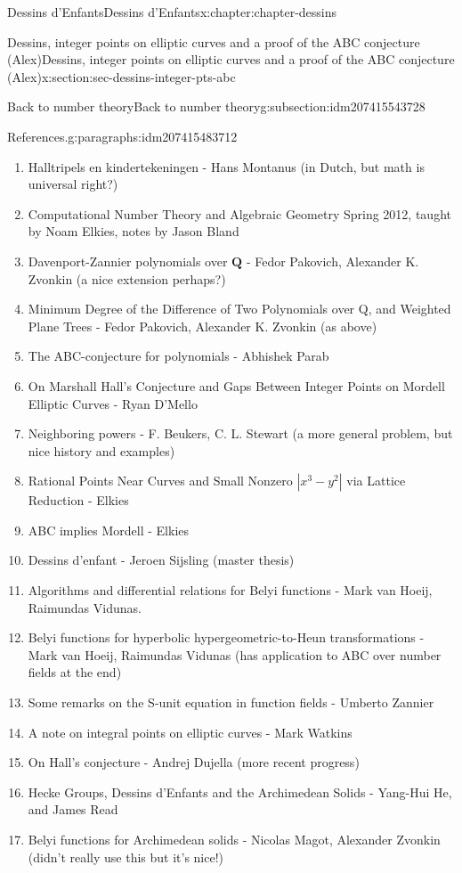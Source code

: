 \documentclass[oneside,10pt,]{book}
\numberwithin{equation}{section}
\newcommand{\QQ}{\mathbf{Q}}
\begin{document}
\begin{chapterptx}{Dessins d'Enfants}{}{Dessins d'Enfants}{}{}{x:chapter:chapter-dessins}
\begin{sectionptx}{Dessins, integer points on elliptic curves and a proof of the ABC conjecture (Alex)}{}{Dessins, integer points on elliptic curves and a proof of the ABC conjecture (Alex)}{}{}{x:section:sec-dessins-integer-pts-abc}
\begin{subsectionptx}{Back to number theory}{}{Back to number theory}{}{}{g:subsection:idm207415543728}
\begin{paragraphs}{References.}{g:paragraphs:idm207415483712}
\begin{enumerate}
\item{}Halltripels en kindertekeningen - Hans Montanus (in Dutch, but math is universal right?)%
\item{}Computational Number Theory and Algebraic Geometry Spring 2012, taught by Noam Elkies, notes by Jason Bland%
\item{}Davenport-Zannier polynomials over \(\QQ\) - Fedor Pakovich, Alexander K. Zvonkin (a nice extension perhaps?)%
\item{}Minimum Degree of the Difference of Two Polynomials over Q, and Weighted Plane Trees -  Fedor Pakovich,  Alexander K. Zvonkin (as above)%
\item{}The ABC-conjecture for polynomials - Abhishek Parab%
\item{}On Marshall Hall's Conjecture and Gaps Between Integer Points on Mordell Elliptic Curves - Ryan D'Mello%
\item{}Neighboring powers - F. Beukers, C. L. Stewart (a more general problem, but nice history and examples)%
\item{}Rational Points Near Curves and Small Nonzero \(| x^3 - y^2|\) via Lattice Reduction - Elkies%
\item{}ABC implies Mordell - Elkies%
\item{}Dessins d'enfant -  Jeroen Sijsling (master thesis)%
\item{}Algorithms and differential relations for Belyi functions - Mark van Hoeij, Raimundas Vidunas.%
\item{}Belyi functions for hyperbolic hypergeometric-to-Heun transformations -  Mark van Hoeij, Raimundas Vidunas (has application to ABC over number fields at the end)%
\item{}Some remarks on the S-unit equation in function fields  - Umberto Zannier%
\item{}A note on integral points on elliptic curves - Mark Watkins%
\item{}On Hall’s conjecture - Andrej Dujella (more recent progress)%
\item{}Hecke Groups, Dessins d'Enfants and the Archimedean Solids -  Yang-Hui He, and James Read%
\item{}Belyi functions for Archimedean solids - Nicolas Magot, Alexander Zvonkin (didn't really use this but it's nice!)%
\end{enumerate}
%
\end{paragraphs}%
\end{subsectionptx}
\end{sectionptx}
%
%
\typeout{************************************************}

\end{chapterptx}
\end{document}
